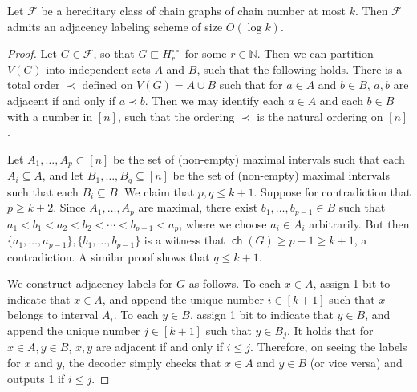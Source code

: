 \documentclass{article}
\newcommand{\cF}{\ensuremath{\mathcal{F}}}
\newcommand{\bN}{\ensuremath{\mathbb{N}}}
\DeclareMathOperator\ch{\mathsf{ch}}
\newcommand{\dcirc}{{\circ\circ}}
\begin{document}
\begin{proposition}
\label{prop:chain-labeling-scheme}
Let $\cF$ be a hereditary class of chain graphs of chain number at most $k$.
Then $\cF$ admits an adjacency labeling scheme of size $O(\log k)$.
\end{proposition}
\begin{proof}
Let $G \in \cF$, so that $G \sqsubset H_r^{\dcirc}$ for some $r \in \bN$. Then we can partition
$V(G)$ into independent sets $A$ and $B$, such that
the following holds. There is a total order $\prec$ defined on $V(G) = A \cup B$ such that for $a
\in A$ and $b \in B$, $a,b$ are adjacent if and only if $a \prec b$. Then we may identify each $a
\in A$ and each $b \in B$ with a number in $[n]$, such that the ordering $\prec$ is the natural
ordering on $[n]$.

Let $A_1, \dotsc, A_p \subset [n]$ be the set of (non-empty) maximal intervals such that each $A_i
\subseteq A$, and let $B_1, \dotsc, B_q \subseteq [n]$ be the set of (non-empty) maximal intervals
such that each $B_i \subseteq B$. We claim that $p,q \leq k+1$. Suppose for contradiction that $p
\geq k+2$. Since $A_1, \dotsc, A_p$ are maximal, there exist $b_1, \dotsc, b_{p-1} \in B$ such that
$a_1 < b_1 < a_2 < b_2 < \dotsm < b_{p-1} < a_p$, where we choose $a_i \in A_i$ arbitrarily. But
then $\{a_1, \dotsc, a_{p-1}\}, \{b_1, \dotsc, b_{p-1}\}$ is a witness that $\ch(G) \geq p-1 \geq
k+1$, a contradiction. A similar proof shows that $q \leq k+1$.

We construct adjacency labels for $G$ as follows. To each $x \in A$, assign 1 bit to indicate that
$x \in A$, and append the unique number $i \in [k+1]$ such that $x$ belongs to interval $A_i$. To
each $y \in B$, assign 1 bit to indicate that $y \in B$, and append the unique number $j \in [k+1]$
such that $y \in B_j$. It holds that for $x \in A, y \in B$, $x,y$ are adjacent if and only if
$i \leq j$. Therefore, on seeing the labels for $x$ and $y$, the decoder simply checks that $x \in
A$ and $y \in B$ (or vice versa) and outputs 1 if $i \leq j$.
\end{proof}
\end{document}
